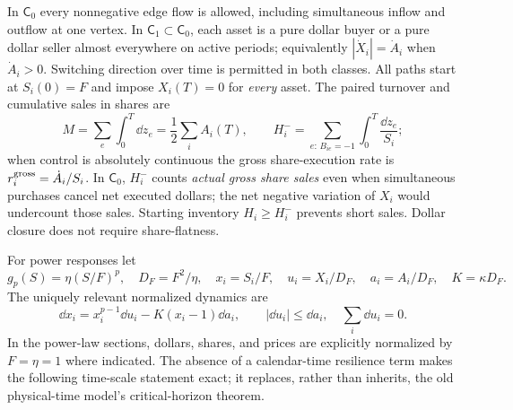 \documentclass[review,hidelinks,onefignum,onetabnum]{siamonline250211}%
\begin{document}
\begin{definition}\label{def:controls}
In $\mathsf C_0$ every nonnegative edge flow is allowed, including simultaneous
inflow and outflow at one vertex. In $\mathsf C_1\subset\mathsf C_0$, each
asset is a pure dollar buyer or a pure dollar seller almost everywhere on
active periods; equivalently $|\dot X_i|=\dot A_i$ when $\dot A_i>0$.
Switching direction over time is permitted in both classes.
All paths start at $S_i(0)=F$ and impose $X_i(T)=0$ for \emph{every} asset.
The paired turnover and cumulative sales in shares are
\begin{equation}\label{eq:resource}
 M=\sum_e\int_0^T\dd z_e=\frac12\sum_i A_i(T),\qquad
 H_i^-=\sum_{e:\,B_{ie}=-1}\int_0^T\frac{\dd z_e}{S_i};
\end{equation}
when control is absolutely continuous the gross share-execution rate is
$r_i^{\rm gross}=\dot A_i/S_i$. In $\mathsf C_0$, $H_i^-$ counts
\emph{actual gross share sales} even when simultaneous purchases cancel
net executed dollars; the net negative variation of $X_i$ would undercount
those sales. Starting inventory $H_i\ge H_i^-$ prevents short sales.
Dollar closure does not require share-flatness.
\end{definition}

For power responses let
\begin{equation}\label{eq:power}
 g_p(S)=\eta(S/F)^p,\quad D_F=F^2/\eta,\quad
 x_i=S_i/F,\quad u_i=X_i/D_F,\quad a_i=A_i/D_F,\quad K=\kappa D_F.
\end{equation}
The uniquely relevant normalized dynamics are
\begin{equation}\label{eq:normalized}
 \boxed{\dd x_i=x_i^{p-1}\dd u_i-K(x_i-1)\dd a_i},\qquad
 |\dd u_i|\le\dd a_i,\quad\sum_i\dd u_i=0.
\end{equation}
In the power-law sections, dollars, shares, and prices are explicitly
normalized by $F=\eta=1$ where indicated. The absence of a calendar-time resilience term makes the following
time-scale statement exact; it replaces, rather than inherits, the
old physical-time model's critical-horizon theorem.
\end{document}
